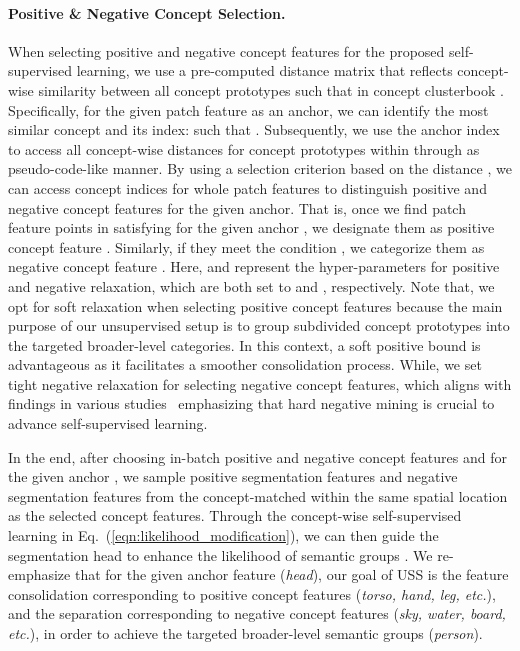 \documentclass{article} \usepackage{iclr2024_conference,times}
\begin{document}
\paragraph{Positive \& Negative Concept Selection.}
\label{sec:posneg}
When selecting positive and negative concept features for the proposed self-supervised learning, we use a pre-computed distance matrix  that reflects concept-wise similarity between all  concept prototypes such that  in concept clusterbook . Specifically, for the given patch feature  as an anchor, we can identify the most similar concept  and its index:  such that . Subsequently, we use the anchor index  to access all concept-wise distances for  concept prototypes within  through  as pseudo-code-like manner. By using a selection criterion based on the distance , we can access concept indices for whole patch features to distinguish positive and negative concept features for the given anchor. That is, once we find patch feature points in  satisfying  for the given anchor , we designate them as positive concept feature . Similarly, if they meet the condition , we categorize them as negative concept feature . Here,  and  represent the hyper-parameters for positive and negative relaxation, which are both set to  and , respectively. Note that, we opt for soft relaxation when selecting positive concept features because the main purpose of our unsupervised setup is to group subdivided concept prototypes into the targeted broader-level categories. In this context, a soft positive bound is advantageous as it facilitates a smoother consolidation process. While, we set tight negative relaxation for selecting negative concept features, which aligns with findings in various studies~\citep{khosla2020supervised, kalantidis2020hard, robinson2021contrastive, wang2021exploring} emphasizing that hard negative mining is crucial to advance self-supervised learning.

In the end, after choosing in-batch positive and negative concept features  and  for the given anchor , we sample positive segmentation features  and negative segmentation features  from the concept-matched  within the same spatial location as the selected concept features. Through the concept-wise self-supervised learning in Eq.~(\ref{eqn:likelihood_modification}), we can then guide the segmentation head  to enhance the likelihood of semantic groups . We re-emphasize that for the given anchor feature (\textit{head}), our goal of USS is the feature consolidation corresponding to positive concept features (\textit{torso, hand, leg, etc.}), and the separation corresponding to negative concept features (\textit{sky, water, board, etc.}), in order to achieve the targeted broader-level semantic groups (\textit{person}).
\end{document}
